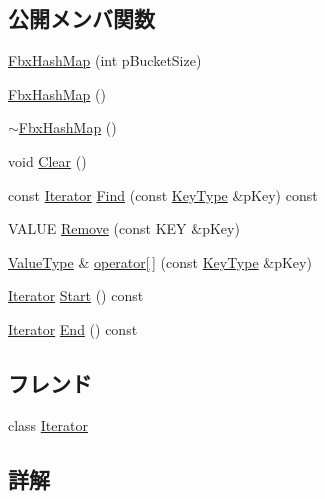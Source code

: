 \subsection*{公開メンバ関数}
\begin{DoxyCompactItemize}
\item 
\hyperlink{class_fbx_hash_map_aa7eae049539759ac5dc0e058346da332}{Fbx\+Hash\+Map} (int p\+Bucket\+Size)
\item 
\hyperlink{class_fbx_hash_map_a398c0d23f439d50d12ff45f04d9c57f2}{Fbx\+Hash\+Map} ()
\item 
\hyperlink{class_fbx_hash_map_a9b75e6940b7ebb7c82628117ce8479e2}{$\sim$\+Fbx\+Hash\+Map} ()
\item 
void \hyperlink{class_fbx_hash_map_a93c7f218e1b8b337296b1758fbe962b9}{Clear} ()
\item 
const \hyperlink{class_fbx_hash_map_1_1_iterator}{Iterator} \hyperlink{class_fbx_hash_map_afdedadf0f0aaa2f3a14404515597c399}{Find} (const \hyperlink{class_fbx_hash_map_ab56799173b6c58b676a94370b64ddbb0}{Key\+Type} \&p\+Key) const
\item 
V\+A\+L\+UE \hyperlink{class_fbx_hash_map_abe6d776a5b88b75b82d92e9c9dd5b513}{Remove} (const K\+EY \&p\+Key)
\item 
\hyperlink{class_fbx_hash_map_a9c4cfd0138aa9233c119403f3cc85501}{Value\+Type} \& \hyperlink{class_fbx_hash_map_a15e7a23bb44c1f0cd21b3b04f84c3fa9}{operator\mbox{[}$\,$\mbox{]}} (const \hyperlink{class_fbx_hash_map_ab56799173b6c58b676a94370b64ddbb0}{Key\+Type} \&p\+Key)
\item 
\hyperlink{class_fbx_hash_map_1_1_iterator}{Iterator} \hyperlink{class_fbx_hash_map_a57577e8a4b29826e68f61e0d086f90d8}{Start} () const
\item 
\hyperlink{class_fbx_hash_map_1_1_iterator}{Iterator} \hyperlink{class_fbx_hash_map_a1e7a9c35fff5bc4fb12f5bc49557ebef}{End} () const
\end{DoxyCompactItemize}
\subsection*{フレンド}
\begin{DoxyCompactItemize}
\item 
class \hyperlink{class_fbx_hash_map_a9830fc407400559db7e7783cc10a9394}{Iterator}
\end{DoxyCompactItemize}


\subsection{詳解}
